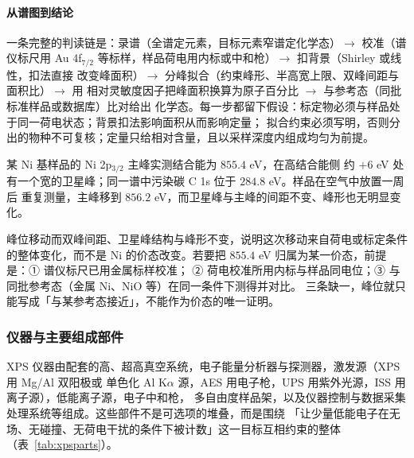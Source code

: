 \paragraph{从谱图到结论}

\begin{dataflow}
一条完整的判读链是：录谱（全谱定元素，目标元素窄谱定化学态）$\rightarrow$ 校准（谱仪标尺用
Au 4f$_{7/2}$ 等标样，样品荷电用内标或中和枪）$\rightarrow$ 扣背景（Shirley 或线性，扣法直接
改变峰面积）$\rightarrow$ 分峰拟合（约束峰形、半高宽上限、双峰间距与面积比）$\rightarrow$ 用
相对灵敏度因子把峰面积换算为原子百分比 $\rightarrow$ 与参考态（同批标准样品或数据库）比对给出
化学态。每一步都留下假设：标定物必须与样品处于同一荷电状态；背景扣法影响面积从而影响定量；
拟合约束必须写明，否则分出的物种不可复核；定量只给相对含量，且以采样深度内组成均匀为前提。
\end{dataflow}

\begin{obs}
某 Ni 基样品的 Ni 2p$_{3/2}$ 主峰实测结合能为 $855.4$ eV，在高结合能侧
约 $+6$ eV 处有一个宽的卫星峰；同一谱中污染碳 C 1s 位于 $284.8$ eV。样品在空气中放置一周后
重复测量，主峰移到 $856.2$ eV，而卫星峰与主峰的间距不变、峰形也无明显变化。
\end{obs}

\begin{infer}
峰位移动而双峰间距、卫星峰结构与峰形不变，说明这次移动来自荷电或标定条件的整体变化，而不是
Ni 的价态改变。若要把 $855.4$ eV 归属为某一价态，前提是：① 谱仪标尺已用金属标样校准；
② 荷电校准所用内标与样品同电位；③ 与同批参考态（金属 Ni、NiO 等）在同一条件下测得并对比。
三条缺一，峰位就只能写成「与某参考态接近」，不能作为价态的唯一证明。
\end{infer}

\subsubsection{仪器与主要组成部件}

XPS 仪器由配套的高、超高真空系统，电子能量分析器与探测器，激发源（XPS 用 Mg/Al 双阳极或
单色化 Al K$\alpha$ 源，AES 用电子枪，UPS 用紫外光源，ISS 用离子源），低能离子源，电子中和枪，
多自由度样品架，以及仪器控制与数据采集处理系统等组成。这些部件不是可选项的堆叠，而是围绕
「让少量低能电子在无场、无碰撞、无荷电干扰的条件下被计数」这一目标互相约束的整体
（表~\ref{tab:xpsparts}）。

